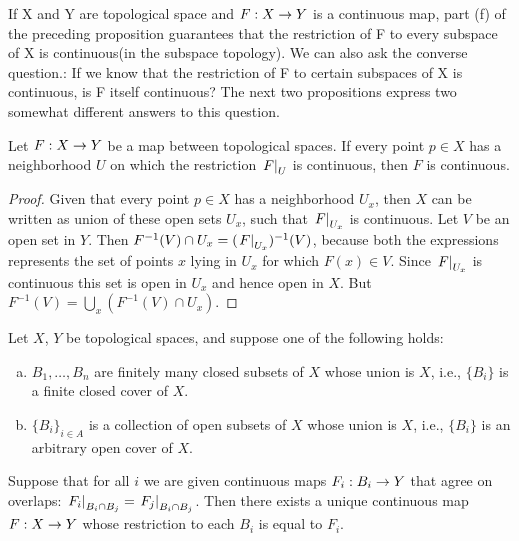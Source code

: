 \documentclass[11pt,a4paper]{article}
\begin{document}
If X and Y are topological space and $F:X\rightarrow Y$ is a continuous map, part (f) of the preceding proposition guarantees that the restriction of F to every subspace of X is continuous(in the subspace topology). We can also ask the converse question.: If we know that the restriction of F to certain subspaces of X is continuous, is F itself continuous? The next two propositions express two somewhat different answers to this question.

\begin{prop}
Let $F:X\rightarrow Y$ be a map between topological spaces. If every point $p\in X$ has a neighborhood $U$ on which the restriction $\left.F\right|_{U}$ is continuous, then $F$ is continuous.
\end{prop}

\begin{proof}
Given that every point $p\in X$ has a neighborhood $U_x$, then $X$ can be written as union of these open sets $U_x$, such that $\left.F\right|_{U_x}$ is continuous. Let $V$ be an open set in $Y$. Then $F^{-1}(V)\cap U_x = (\left.F\right|_{U_x})^{-1}(V)$, because both the expressions represents the set of points $x$ lying in $U_x$ for which $F(x)\in V$. Since $\left.F\right|_{U_x}$ is continuous this set is open in $U_x$ and hence open in $X$. But $F^{-1}(V) = \bigcup_x (F^{-1}(V)\cap U_x)$.
\end{proof}

\begin{prop} \label{prop:gluing_lemma}
Let $X$, $Y$ be topological spaces, and suppose one of the following holds:
\begin{enumerate}[(a)]
    \item $B_1,\ldots,B_n$ are finitely many closed subsets of $X$ whose union is $X$, i.e., $\{B_i\}$ is a finite closed cover of $X$.
    \item $\{B_i\}_{i\in A}$ is a collection of open subsets of $X$ whose union is $X$, i.e., $\{B_i\}$ is an arbitrary open cover of $X$.
\end{enumerate}
Suppose that for all $i$ we are given continuous maps $F_i:B_i\rightarrow Y$ that agree on overlaps: $\left.F_i\right|_{B_i\cap B_j} = \left.F_j\right|_{B_i\cap B_j}$. Then there exists a unique continuous map $F:X\rightarrow Y$ whose restriction to each $B_i$ is equal to $F_i$.
\end{prop}
\end{document}
